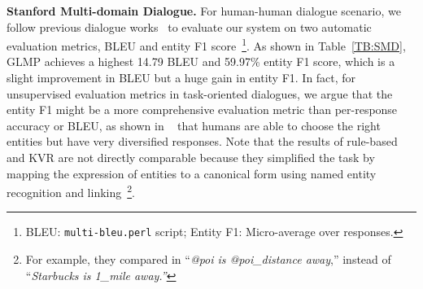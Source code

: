 \documentclass{article} \usepackage{iclr2019_conference,times}
\begin{document}
\begin{table}[t]
\setlength{\abovecaptionskip}{-2pt} 
\caption{Ablation study using single hop model.}
\label{TB:ABLATION}
\begin{center}
\end{center}
\vspace{-1.0\baselineskip}
\end{table}

\textbf{Stanford Multi-domain Dialogue. }
For human-human dialogue scenario, we follow previous dialogue works~\citep{ericKVR2017,zhao2017generative,mem2seq} to evaluate our system on two automatic evaluation metrics, BLEU and entity F1 score~\footnote{BLEU: \texttt{multi-bleu.perl} script; Entity F1: Micro-average over responses.}. As shown in Table~\ref{TB:SMD}, GLMP achieves a highest 14.79 BLEU and 59.97\% entity F1 score, which is a slight improvement in BLEU but a huge gain in entity F1. In fact, for unsupervised evaluation metrics in task-oriented dialogues, we argue that the entity F1 might be a more comprehensive evaluation metric than per-response accuracy or BLEU, as shown in ~\cite{ericKVR2017} that humans are able to choose the right entities but have very diversified responses. Note that the results of rule-based and KVR are not directly comparable because they simplified the task by mapping the expression of entities to a canonical form using named entity recognition and linking~\footnote{For example, they compared in ``\textit{@poi is @poi\_distance away},'' instead of ``\textit{Starbucks is 1\_mile away.''}}.
\end{document}
